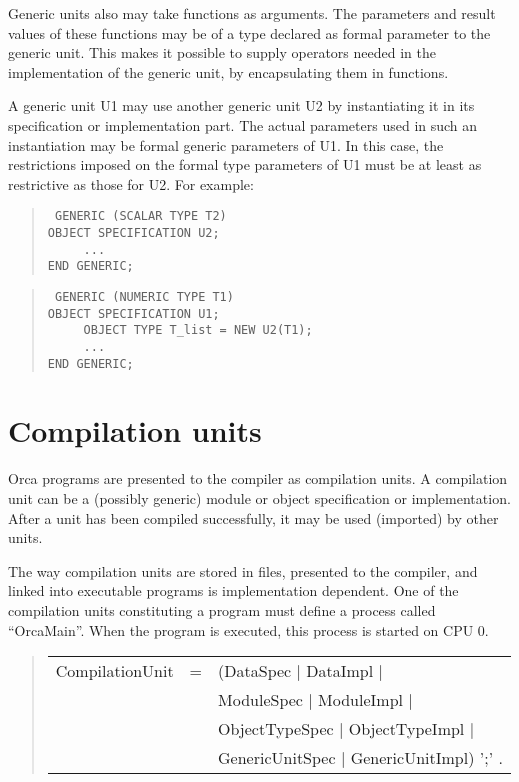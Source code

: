 \documentclass[10pt]{article}
\newenvironment{grammar}
{\begin{quote} \begin{tabular}{p{3.8cm} l l}}
{\end{tabular}\end{quote}}
\begin{document}
Generic units also may take functions as arguments.
The parameters and result values of these functions may be of a type
declared as formal parameter to the generic unit.
This makes it possible to supply operators needed in the implementation
of the generic unit, by encapsulating them in functions.

A generic unit U1 may use another generic unit U2 by instantiating it in
its specification or implementation part.
The actual parameters used in such an instantiation may be formal
generic parameters of U1.
In this case, the restrictions imposed on the formal type parameters 
of U1 must be at least as restrictive as those for U2.
For example:
\begin{quote}\tt
GENERIC (SCALAR TYPE T2) \\
OBJECT SPECIFICATION U2; \\
\mbox{~~~~~}... \\
END GENERIC; \\
\end{quote}
\begin{quote}\tt
GENERIC (NUMERIC TYPE T1) \\
OBJECT SPECIFICATION U1; \\
\mbox{~~~~~}OBJECT TYPE T\_list = NEW U2(T1); \\
\mbox{~~~~~}... \\
END GENERIC;
\end{quote}
\section{Compilation units}

Orca programs are presented to the compiler as compilation units.
A compilation unit can be a (possibly generic) module or object specification
or implementation.
After a unit has been compiled successfully,
it may be used (imported) by other units.

The way compilation units are stored in files, presented to the
compiler, and linked into executable programs is implementation dependent.
One of the compilation units constituting a program must define
a process called ``OrcaMain''. When the program is executed,
this process is started on CPU 0.
\begin{grammar}
CompilationUnit & = &  (DataSpec $|$ DataImpl $|$ \\
& & ModuleSpec $|$ ModuleImpl $|$ \\
& & ObjectTypeSpec $|$ ObjectTypeImpl $|$ \\
& & GenericUnitSpec $|$ GenericUnitImpl) ';' .
\end{grammar}
\end{document}
